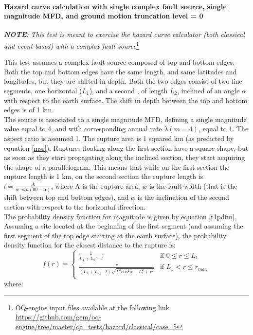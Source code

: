 \paragraph{Hazard curve calculation with single
complex fault source, single magnitude MFD, and ground motion truncation level =
0}
\textit{\textbf{NOTE}: This test is meant to exercise the hazard curve
calculator (both classical and event-based) with a complex fault source}\footnote{
    OQ-engine input files available at the following link
    \url{https://github.com/gem/oq-engine/tree/master/qa_tests/hazard/classical/case_5}} 

This test assumes a complex fault source composed of top and bottom edges. Both
the top and bottom edges have the same length, and same latitudes and
longitudes, but they are shifted in depth. Both the two edges consist of two
line segments, one horizontal ($L_{1}$), and a second , of length $L_{2}$,
inclined of an angle $\alpha$ with respect to the earth surface. The shift in
depth between the top and bottom edges is of 1 km.\\ The source is associated to
a single magnitude MFD, defining a single magnitude value equal to 4, and with
corresponding annual rate $\lambda(m=4)$, equal to 1. The aspect ratio is
assumed 1. The rupture area is 1 squared km (as predicted by equation
\ref{msr}). Ruptures floating along the first section have a square shape, but
as soon as they start propagating along the inclined section, they start
acquiring the shape of a parallelogram.  This means that while on the first
section the rupture length is 1 km, on the second section the rupture length is
$l=\frac{A}{w\cdot sin(90 - \alpha)}$, where A is the rupture area, $w$ is the
fault width (that is the shift between top and bottom edges), and $\alpha$ is
the inclination of the second section with respect to the horizontal
direction.\\ The probability density function for magnitude is given by equation
\ref{t1pdfm}. Assuming a site located at the beginning of the first segment (and
assuming the first segment of the top edge starting at the earth surface), the
probability density function for the closest distance to the rupture is:
%
\begin{equation} f(r) = \begin{cases} \frac{1}{L_{1} + L_{2} - l}    &
\text{if } 0 \leq r \leq L_{1} \\ \frac{r}{(L_{1} + L_{2} -
l)\sqrt{L_{1}^{2}cos^{2}\alpha - L_{1}^{2} + r^{2}}}                 &
    \text{if } L_{1} < r \leq r_{max} \\ \end{cases} \end{equation} where:
